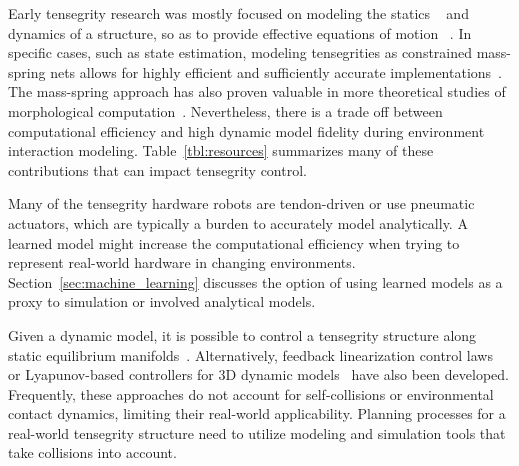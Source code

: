 Early tensegrity research was mostly focused on modeling the statics
~\cite{2003Tensegrity:-Str, Juan2008, Arsenault:2008bh} and dynamics
of a structure, so as to provide effective equations of motion
~\cite{Kanchanasaratool2002Motion-Control-, De-Oliveira:2006ys,
skelton_tensegrity_2009}.  In specific cases, such as state
estimation, modeling tensegrities as constrained mass-spring nets
allows for highly efficient and sufficiently accurate
implementations~\cite{caluwaerts2016esitmation}.  The mass-spring approach
has also proven valuable in more theoretical studies of morphological
computation~\cite{Hauser}. Nevertheless, there is a trade off between
computational efficiency and high dynamic model fidelity during
environment interaction modeling.  Table~\ref{tbl:resources}
summarizes many of these contributions that can impact tensegrity
control.



Many of the tensegrity hardware robots are tendon-driven or use
pneumatic actuators, which are typically a burden to accurately model
analytically. A learned model might increase the computational
efficiency when trying to represent real-world hardware in changing
environments.  Section~\ref{sec:machine_learning} discusses the option of
using learned models as a proxy to simulation or involved analytical
models.


Given a dynamic model, it is possible to control a tensegrity
structure along static equilibrium
manifolds~\cite{Skelton1997Controllable-Te}.  Alternatively, feedback
linearization control laws~\cite{Aldrich2003Control-Synthes} or
Lyapunov-based controllers for 3D dynamic
models~\cite{Wroldsen2006A-Discussion-on} have also been
developed. Frequently, these approaches do not account for
self-collisions or environmental contact dynamics, limiting their
real-world applicability.  Planning processes for a real-world
tensegrity structure need to utilize modeling and simulation tools
that take collisions into account.


